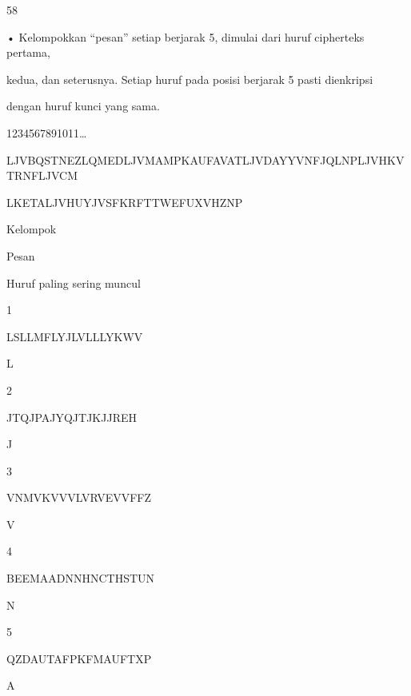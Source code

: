 \documentclass{article}
\begin{document}

58

• Kelompokkan “pesan” setiap berjarak 5, dimulai dari huruf cipherteks pertama, 

kedua, dan seterusnya. Setiap huruf pada posisi berjarak 5 pasti dienkripsi 

dengan huruf kunci yang sama.

   1234567891011…

 LJVBQSTNEZLQMEDLJVMAMPKAUFAVATLJVDAYYVNFJQLNPLJVHKVTRNFLJVCM 

LKETALJVHUYJVSFKRFTTWEFUXVHZNP


    Kelompok 

Pesan  



    Huruf paling sering muncul

  1  

LSLLMFLYJLVLLLYKWV 


L

   2  

JTQJPAJYQJTJKJJREH 


J

   3  

VNMVKVVVLVRVEVVFFZ 


V

   4  

BEEMAADNNHNCTHSTUN 


N

   5  

QZDAUTAFPKFMAUFTXP 


A
\end{document}
